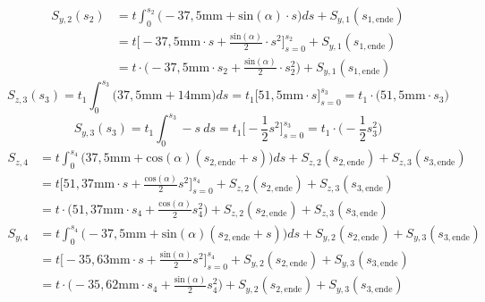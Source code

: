 \begin{itemize}
\begin{equation}
\end{equation}
\begin{equation}
	\begin{split}
		S_{y,2}(s_2) &= t\int_{0}^{s_2}\bigg(-37,5\mathrm{mm}+\mathrm{sin}(\alpha)\cdot s\bigg)ds + S_{y,1}(s_{1,\mathrm{ende}}) \\\
		&= t\bigg[-37,5\mathrm{mm}\cdot s +\frac{\mathrm{sin}(\alpha)}{2}\cdot s^2\bigg]_{s=0}^{s_2} + S_{y,1}(s_{1,\mathrm{ende}})\\\
		&= t\cdot\bigg(-37,5\mathrm{mm}\cdot s_2 +\frac{\mathrm{sin}(\alpha)}{2}\cdot s^2_2\bigg) + S_{y,1}(s_{1,\mathrm{ende}})
	\end{split}
\end{equation}
\begin{equation}
	S_{z,3}(s_3) = t_1\int_{0}^{s_3}\bigg(37,5\mathrm{mm}+14\mathrm{mm}\bigg)ds = t_1\bigg[51,5\mathrm{mm}\cdot s\bigg]_{s=0}^{s_3} = t_1\cdot\bigg(51,5\mathrm{mm}\cdot s_3\bigg)
\end{equation}
\begin{equation}
	S_{y,3}(s_3) = t_1\int_{0}^{s_3}-s\ ds= t_1\bigg[-\frac{1}{2}s^2\bigg]_{s=0}^{s_3} = t_1\cdot\bigg(-\frac{1}{2}s^2_3\bigg)
\end{equation}
\begin{equation}
\begin{split}
	S_{z,4} &= t\int_{0}^{s_4}\bigg(37,5\mathrm{mm}+\mathrm{cos}(\alpha)(s_{2,\mathrm{ende}}+s)\bigg)ds + S_{z,2}(s_{2,\mathrm{ende}})  + S_{z,3}(s_{3,\mathrm{ende}})\\\
	&= t\bigg[51,37\mathrm{mm}\cdot s + \frac{\mathrm{cos}(\alpha)}{2}s^2\bigg]_{s=0}^{s_4} + S_{z,2}(s_{2,\mathrm{ende}})  + S_{z,3}(s_{3,\mathrm{ende}})\\\
	&= t\cdot\bigg(51,37\mathrm{mm}\cdot s_4 + \frac{\mathrm{cos}(\alpha)}{2}s^2_4\bigg) + S_{z,2}(s_{2,\mathrm{ende}})  + S_{z,3}(s_{3,\mathrm{ende}})
\end{split}
\end{equation}
\begin{equation}
\begin{split}
	S_{y,4} &= t\int_{0}^{s_4}\bigg(-37,5\mathrm{mm}+\mathrm{sin}(\alpha)(s_{2,\mathrm{ende}}+s)\bigg)ds + S_{y,2}(s_{2,\mathrm{ende}})  + S_{y,3}(s_{3,\mathrm{ende}})\\\
	&= t\bigg[-35,63\mathrm{mm}\cdot s + \frac{\mathrm{sin}(\alpha)}{2}s^2\bigg]_{s=0}^{s_4} + S_{y,2}(s_{2,\mathrm{ende}})  + S_{y,3}(s_{3,\mathrm{ende}})\\\
	&= t\cdot\bigg(-35,62\mathrm{mm}\cdot s_4 + \frac{\mathrm{sin}(\alpha)}{2}s^2_4\bigg) + S_{y,2}(s_{2,\mathrm{ende}})  + S_{y,3}(s_{3,\mathrm{ende}})

\end{split}
\end{equation}
\end{itemize}
